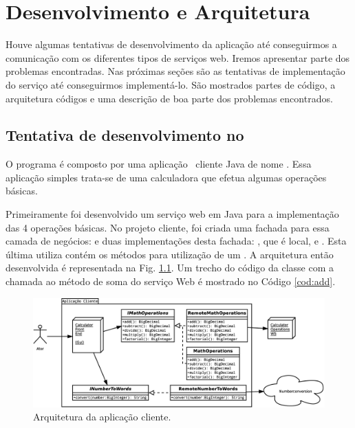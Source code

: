 %

\chapter{Desenvolvimento e Arquitetura}

Houve algumas tentativas de desenvolvimento da aplicação até conseguirmos a
comunicação com os diferentes tipos de serviços web. Iremos apresentar parte dos
problemas encontradas. Nas próximas seções são as tentativas de implementação do
serviço até conseguirmos implementá-lo. São mostrados partes de código, a
arquitetura códigos e uma descrição de boa parte dos problemas encontrados. 

\section{Tentativa de desenvolvimento no \NetBeansv}

O programa é composto por uma aplicação \desktop\ cliente Java de nome
. Essa aplicação simples trata-se de uma calculadora que
efetua algumas operações básicas. 

Primeiramente foi desenvolvido um serviço web em Java para a implementação das 4
operações básicas. No projeto cliente, foi criada uma fachada para essa camada
de negócios:  e duas implementações desta fachada:
, que é local, e . Esta última
utiliza contém os métodos para utilização de um \WebService. A arquitetura então
desenvolvida é representada na Fig.  \ref{fig:arquitetura:calc}. Um trecho do
código da classe  com a chamada ao método de soma do
serviço Web é mostrado no Código \ref{cod:add}.

\begin{figure}[htb]
  \centering
    \includegraphics[width=\textwidth]{imgs/calculadora}
  \caption{Arquitetura da aplicação cliente.}
  \label{fig:arquitetura:calc}
\end{figure}

